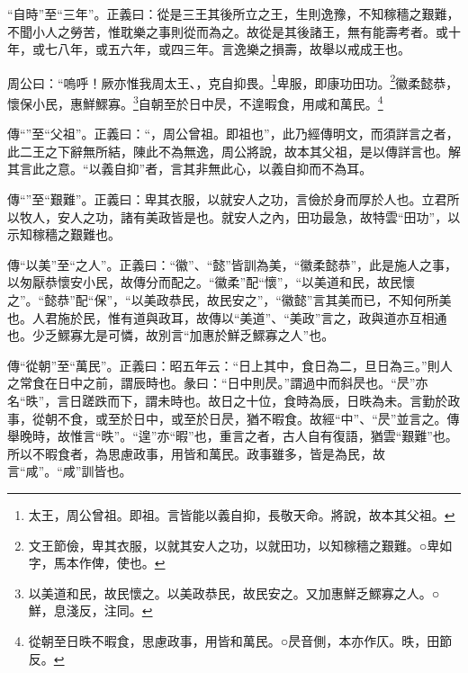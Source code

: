 {\noindent\shu{}\fzkt “自時”至“三年”。正義曰：從是三王其後所立之王，生則逸豫，不知稼穡之艱難，不聞小人之勞苦，惟耽樂之事則從而為之。故從是其後諸王，無有能壽考者。或十年，或七八年，或五六年，或四三年。言逸樂之損壽，故舉以戒成王也。 \par}

周公曰：“嗚呼！厥亦惟我周太王、，克自抑畏。\footnote{太王，周公曾祖。即祖。言皆能以義自抑，長敬天命。將說，故本其父祖。}卑服，即康功田功。\footnote{文王節儉，卑其衣服，以就其安人之功，以就田功，以知稼穡之艱難。○卑如字，馬本作俾，使也。}徽柔懿恭，懷保小民，惠鮮鰥寡。\footnote{以美道和民，故民懷之。以美政恭民，故民安之。又加惠鮮乏鰥寡之人。○鮮，息淺反，注同。}自朝至於日中昃，不遑暇食，用咸和萬民。\footnote{從朝至日昳不暇食，思慮政事，用皆和萬民。○昃音側，本亦作仄。昳，田節反。}


{\noindent\zhuan{}\fzbyks 傳“”至“父祖”。正義曰：“，周公曾祖。即祖也”，此乃經傳明文，而須詳言之者，此二王之下辭無所結，陳此不為無逸，周公將說，故本其父祖，是以傳詳言也。解其言此之意。“以義自抑”者，言其非無此心，以義自抑而不為耳。 \par}

{\noindent\zhuan{}\fzbyks 傳“”至“艱難”。正義曰：卑其衣服，以就安人之功，言儉於身而厚於人也。立君所以牧人，安人之功，諸有美政皆是也。就安人之內，田功最急，故特雲“田功”，以示知稼穡之艱難也。 \par}

{\noindent\zhuan{}\fzbyks 傳“以美”至“之人”。正義曰：“徽”、“懿”皆訓為美，“徽柔懿恭”，此是施人之事，以匆厭恭懷安小民，故傳分而配之。“徽柔”配“懷”，“以美道和民，故民懷之”。“懿恭”配“保”，“以美政恭民，故民安之”，“徽懿”言其美而已，不知何所美也。人君施於民，惟有道與政耳，故傳以“美道”、“美政”言之，政與道亦互相通也。少乏鰥寡尢是可憐，故別言“加惠於鮮乏鰥寡之人”也。 \par}

{\noindent\zhuan{}\fzbyks 傳“從朝”至“萬民”。正義曰：昭五年云：“日上其中，食日為二，旦日為三。”則人之常食在日中之前，謂辰時也。彖曰：“日中則昃。”謂過中而斜昃也。“昃”亦名“昳”，言日蹉跌而下，謂未時也。故日之十位，食時為辰，日昳為未。言勤於政事，從朝不食，或至於日中，或至於日昃，猶不暇食。故經“中”、“昃”並言之。傳舉晚時，故惟言“昳”。“遑”亦“暇”也，重言之者，古人自有復語，猶雲“艱難”也。所以不暇食者，為思慮政事，用皆和萬民。政事雖多，皆是為民，故言“咸”。“咸”訓皆也。 \par}

